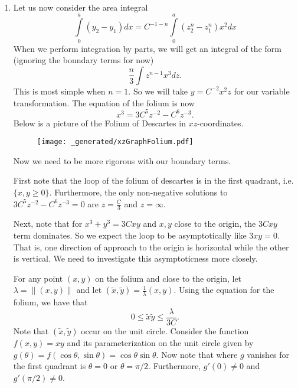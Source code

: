 \begin{enumerate}
\item
Let us now consider the area integral
\begin{equation}
\int\limits_0^a (y_2 - y_1) dx = C^{-1 - n} \int\limits_0^a (z_2^n - z_1^n) x^2 dx
\end{equation}
When we perform integration by parts, we will get an integral of the form (ignoring the boundary terms for now)
\begin{equation}
\frac{n}{3}\int z^{n - 1} x^3 dz. 
\end{equation}
This is most simple when \(n = 1\). So we will take \(y = C^{-2} x^2 z\) for our variable transformation. The equation of the folium is now
\begin{equation}
x^3 = 3C^5 z^{-2} - C^6 z^{-3}.
\end{equation}
Below is a picture of the Folium of Descartes in \(xz\)-coordinates.
\begin{figure}[h]
\centering
\texttt{[image: \_generated/xzGraphFolium.pdf]}
\end{figure}

Now we need to be more rigorous with our boundary terms. 

First note that the loop of the folium of descartes is in the first quadrant, i.e. \(\{x,y \geq 0\}\). 
Furthermore, the only non-negative solutions to \(3C^5 z^{-2} - C^6 z^{-3} = 0 \) are \(z = \frac{C}{3}\) and \(z = \infty\). 

Next, note that for \(x^3 + y^3 = 3Cxy\) and \(x, y\) close to the origin, the \(3Cxy\) term dominates. So we expect the loop to
be asymptotically like \(3xy = 0\). That is, one direction of approach to the origin is horizontal while the other is vertical. We need
to investigate this asymptoticness more closely.

For any point \((x,y)\) on the folium and close to the origin, let \(\lambda = \|(x,y)\|\) and let \((\tilde x, \tilde y) = \frac{1}{\lambda}(x, y)\). 
Using the equation for the folium, we have that 
\begin{equation}
0 \leq \tilde x \tilde y \leq \frac{\lambda}{3C}.  
\end{equation}
Note that \((\tilde x, \tilde y)\) occur on the unit circle. Consider the function \(f(x,y) = xy\) and its parameterization on the unit circle
given by \(g(\theta) = f(\cos\theta, \sin\theta) = \cos\theta \sin\theta\). Now note that where \(g\) vanishes for the first quadrant is \(\theta = 0\) or
\(\theta = \pi/2\). Furthermore, \(g'(0)\neq 0\) and \(g'(\pi/2) \neq 0\). 


\end{enumerate}
